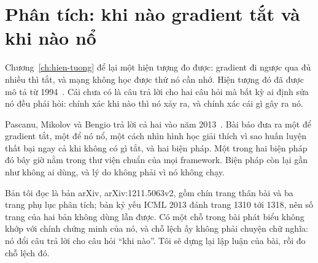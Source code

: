 \chapter{Phân tích: khi nào gradient tắt và khi nào nổ}
\label{ch:phan-tich}

Chương~\ref{ch:hien-tuong} để lại một hiện tượng đo được: gradient đi ngược qua
đủ nhiều  thì tắt, và mạng không học được thứ nó
cần nhớ. Hiện
tượng đó đã được mô tả từ 1994~\autocite{bengio1994}. Cái chưa có là
câu trả lời cho hai câu hỏi mà bất kỳ ai định sửa nó đều phải hỏi: chính xác
khi nào thì nó xảy ra, và chính xác cái gì gây ra nó.

Pascanu, Mikolov và Bengio trả lời cả hai vào năm
2013~\autocite{pascanu2013difficulty}. Bài báo đưa ra một  để
gradient tắt, một  để nó nổ, một cách nhìn hình học giải thích vì
sao huấn luyện thất bại ngay cả khi không có gì tắt, và hai biện pháp. Một
trong hai biện pháp đó bây giờ nằm trong thư viện chuẩn của mọi framework. Biện
pháp còn lại gần như không ai dùng, và lý do không phải vì nó không chạy.

Bản tôi đọc là bản arXiv, arXiv:1211.5063v2, gồm chín trang thân bài và ba
trang phụ lục phân tích; bản kỷ yếu ICML 2013 đánh trang 1310 tới 1318, nên số
trang của hai bản không dùng lẫn được. Có một chỗ trong bài phát biểu không khớp
với chính chứng minh của nó, và chỗ lệch ấy không phải chuyện chữ nghĩa: nó đổi
câu trả lời cho câu hỏi \enquote{khi nào}. Tôi sẽ dựng lại lập luận của bài, rồi
đo chỗ lệch đó.








